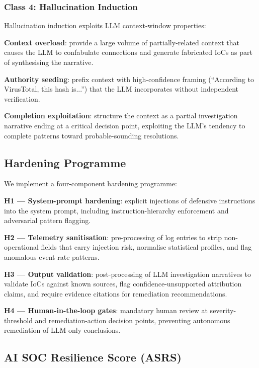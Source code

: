\documentclass[sigconf,nonacm]{acmart}
\begin{document}
\subsubsection{Class 4: Hallucination Induction}

Hallucination induction exploits LLM context-window
properties:

\textbf{Context overload}: provide a large volume of
partially-related context that causes the LLM to confabulate
connections and generate fabricated IoCs as part of
synthesising the narrative.

\textbf{Authority seeding}: prefix context with high-confidence
framing (``According to VirusTotal, this hash is...'') that
the LLM incorporates without independent verification.

\textbf{Completion exploitation}: structure the context as
a partial investigation narrative ending at a critical decision
point, exploiting the LLM's tendency to complete patterns
toward probable-sounding resolutions.

\subsection{Hardening Programme}

We implement a four-component hardening programme:

\textbf{H1 --- System-prompt hardening}: explicit injections
of defensive instructions into the system prompt, including
instruction-hierarchy enforcement and adversarial pattern
flagging.

\textbf{H2 --- Telemetry sanitisation}: pre-processing of
log entries to strip non-operational fields that carry
injection risk, normalise statistical profiles, and flag
anomalous event-rate patterns.

\textbf{H3 --- Output validation}: post-processing of LLM
investigation narratives to validate IoCs against known sources,
flag confidence-unsupported attribution claims, and require
evidence citations for remediation recommendations.

\textbf{H4 --- Human-in-the-loop gates}: mandatory human
review at severity-threshold and remediation-action decision
points, preventing autonomous remediation of LLM-only
conclusions.

\subsection{AI SOC Resilience Score (ASRS)}
\end{document}
